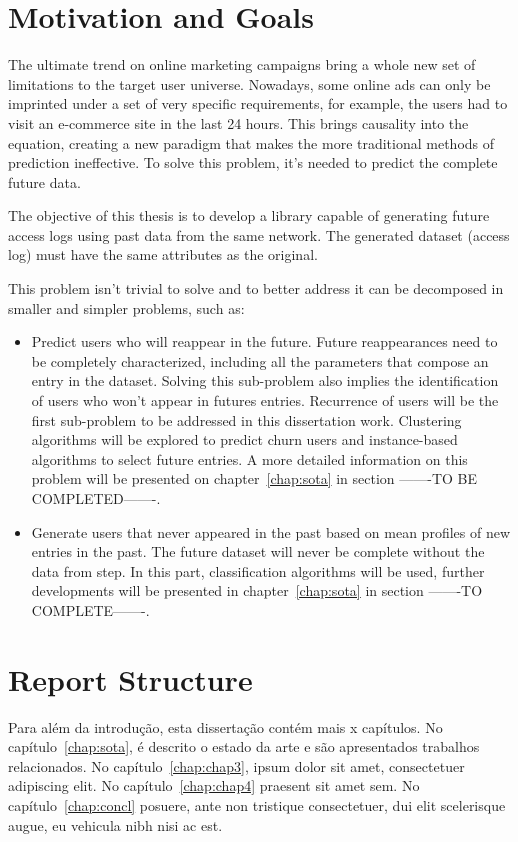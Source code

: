 \section{Motivation and Goals} \label{sec:goals}

The ultimate trend on online marketing campaigns bring a whole new set of limitations to the target user universe. Nowadays, some online ads can only
be imprinted under a set of very specific requirements, for example, the users had to visit an e-commerce site in the last 24 hours. 
This brings causality into the equation, creating a new paradigm that makes 
the more traditional methods of prediction ineffective. To solve this problem, it's needed to predict the complete future data.

The objective of this thesis is to develop a library capable of generating future access logs using past data from the same network.
The generated dataset (access log) must have the same attributes as the original.

This problem isn't trivial to solve and to better address it can be decomposed in smaller and simpler problems, such as:
\begin{itemize}
    \item Predict users who will reappear in the future. Future reappearances need to be completely characterized, including 
      all the parameters that compose an entry in the dataset. Solving this sub-problem also implies the identification of users who
      won't appear in futures entries. Recurrence of users will be the first sub-problem to be addressed in this dissertation work. 
      Clustering algorithms will be explored to predict churn users and instance-based algorithms to select future entries. A more detailed information
      on this problem will be presented on chapter~\ref{chap:sota} in section -------TO BE COMPLETED-------.
    \item Generate users that never appeared in the past based on mean profiles of new entries in the past. The future dataset will never
      be complete without the data from step. In this part, classification algorithms will be used, further developments will be presented in
      chapter~\ref{chap:sota} in section -------TO COMPLETE-------.
\end{itemize}

\section{Report Structure} \label{sec:struct}

Para além da introdução, esta dissertação contém mais x capítulos.
No capítulo~\ref{chap:sota}, é descrito o estado da arte e são
apresentados trabalhos relacionados. 
No capítulo~\ref{chap:chap3}, ipsum dolor sit amet, consectetuer
adipiscing elit.
No capítulo~\ref{chap:chap4} praesent sit amet sem. 
No capítulo~\ref{chap:concl}  posuere, ante non tristique
consectetuer, dui elit scelerisque augue, eu vehicula nibh nisi ac
est. 
